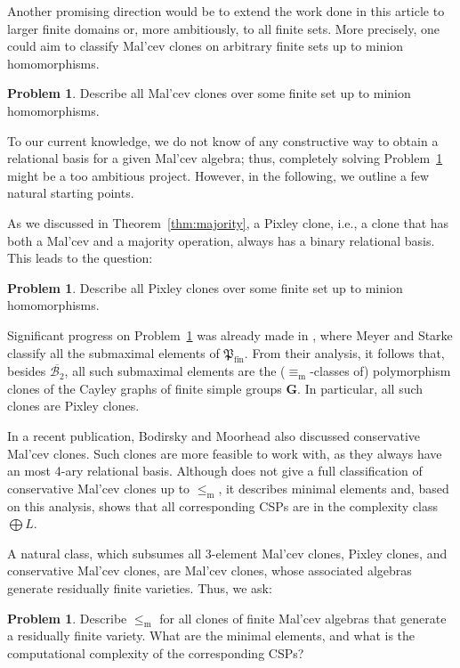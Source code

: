 \documentclass[12pt]{amsart}
\theoremstyle{definition}
\newtheorem{problem}[theorem]{Problem}
\theoremstyle{definition}
\newcommand{\Pfin}{\mathfrak P_{\mathrm{fin}}}
\newcommand{\alg}[1]{\mathbf{#1}}
\newcommand{\isaminorof}{\leq_{\mathrm{m}}}
\newcommand{\minorequivalentto}{\equiv_{\mathrm{m}}}
\begin{document}
Another promising direction would be to extend the work done in this article to larger finite domains or, more ambitiously, to all finite sets. More precisely, one could aim to classify Mal'cev clones on arbitrary finite sets up to minion homomorphisms. 

\begin{problem}\label{prob:Prob2}
Describe all Mal'cev clones over some finite set up to minion homomorphisms.
\end{problem}

To our current knowledge, we do not know of any constructive way to obtain a relational basis for a given Mal'cev algebra; thus, completely solving Problem~\ref{prob:Prob2} might be a too ambitious project. However, in the following, we outline a few natural starting points.

As we discussed in Theorem~\ref{thm:majority}, a Pixley clone, i.e., a clone that has both a Mal'cev and a majority operation, always has a binary relational basis. This leads to the question:

\begin{problem} \label{prob:Prob3}
Describe all Pixley clones over some finite set up to minion homomorphisms.
\end{problem}

Significant progress on Problem~\ref{prob:Prob3} was already made in \cite{meyerSubmaximal}, where Meyer and Starke classify all the submaximal elements of $\Pfin$. From their analysis, it follows that, besides $\overline{\mathcal B_2}$, all such submaximal elements are the ($\minorequivalentto$-classes of) polymorphism clones of the Cayley graphs of finite simple groups $\alg{G}$. In particular, all such clones are Pixley clones.


In a recent publication, Bodirsky and Moorhead \cite{BM-conservativemaltsev} also discussed conservative Mal'cev clones. Such clones are more feasible to work with, as they always have an most 4-ary relational basis. Although \cite{BM-conservativemaltsev} does not give a full classification of conservative Mal'cev clones up to $\isaminorof$, it describes minimal elements and, based on this analysis, shows that all corresponding CSPs are in the complexity class $\bigoplus L$.

A natural class, which subsumes all 3-element Mal'cev clones, Pixley clones, and conservative Mal'cev clones, are Mal'cev clones, whose associated algebras generate residually finite varieties. Thus, we ask:

\begin{problem} \label{prob:Prob4}
Describe $\isaminorof$ for all clones of finite Mal'cev algebras that generate a residually finite variety. What are the minimal elements, and what is the computational complexity of the corresponding CSPs?
\end{problem}
\end{document}
